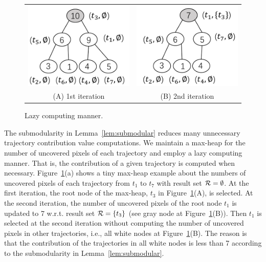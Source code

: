 
\begin{figure}
 \centering
 \small
 \begin{tabular}{cc}
   \includegraphics[width=0.35\columnwidth]{pictures/1st}
   &
   \includegraphics[width=0.35\columnwidth]{pictures/2nd}
   \\
   (A) 1st iteration
   &
   (B) 2nd iteration
 \end{tabular}
 \vspace{-3mm}
 \caption{Lazy computing manner.} \label{fig:heap} %
 \vspace{-6mm}
\end{figure}


The submodularity in Lemma~\ref{lem:submodular} reduces many unnecessary trajectory contribution value computations.
We maintain a max-heap for the number of uncovered pixels of each trajectory and employ a lazy computing manner.
That is, the contribution of a given trajectory is computed when necessary.
Figure~\ref{fig:heap}(a) shows a tiny max-heap example about the numbers of uncovered pixels of each trajectory from $t_1$ to $t_7$ with result set $\mathcal{R}=\emptyset$.
At the first iteration, the root node of the max-heap, $t_3$ in Figure~\ref{fig:heap}(A), is selected.
At the second iteration, the number of uncovered pixels of the root node $t_1$ is updated to 7 w.r.t. result set $\mathcal{R} = \{t_3 \}$ (see gray node at Figure~\ref{fig:heap}(B)).
Then $t_1$ is selected at the second iteration without computing the number of uncovered pixels in other trajectories, i.e., all white nodes at Figure~\ref{fig:heap}(B).
The reason is that the contribution of the trajectories in all white nodes is less than 7 according to the submodularity in Lemma~\ref{lem:submodular}.

